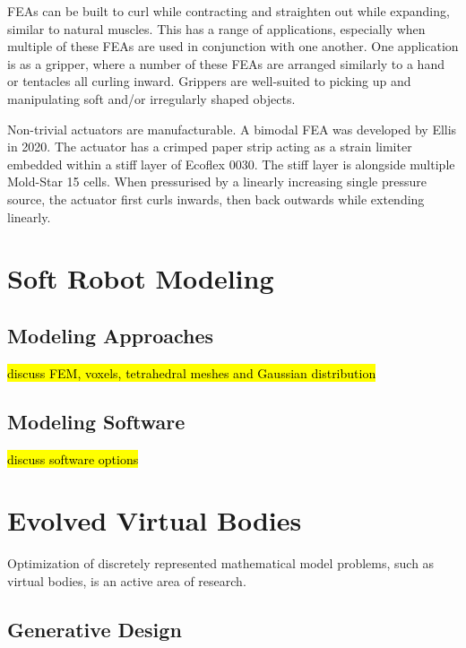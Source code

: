 FEAs can be built to curl while contracting and straighten out while expanding, similar to natural muscles. This has a range of applications, especially when multiple of these FEAs are used in conjunction with one another. One application is as a gripper, where a number of these FEAs are arranged similarly to a hand or tentacles all curling inward. Grippers are well-suited to picking up and manipulating soft and/or irregularly shaped objects. \cite{Whitesides2018}

Non-trivial actuators are manufacturable. A bimodal FEA was developed by Ellis in 2020. The actuator has a crimped paper strip acting as a strain limiter embedded within a stiff layer of Ecoflex 0030. The stiff layer is alongside multiple Mold-Star 15 cells. When pressurised by a linearly increasing single pressure source, the actuator  first curls inwards, then back outwards while extending linearly. \cite{Ellis2020a}

\section{Soft Robot Modeling}

\subsection{Modeling Approaches}

\hl{discuss FEM, voxels, tetrahedral meshes and Gaussian distribution}

\subsection{Modeling Software}

\hl{discuss software options}

\section{Evolved Virtual Bodies}

Optimization of discretely represented mathematical model problems, such as virtual bodies, is an active area of research.

\subsection{Generative Design}

